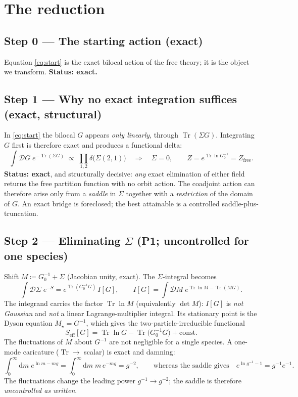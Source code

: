 \documentclass[11pt]{article}
\theoremstyle{remark}
\begin{document}
\section{The reduction}

\subsection*{Step 0 --- The starting action (exact)}

Equation \eqref{eq:start} is the exact bilocal action of the free theory; it is the
object we transform. \textbf{Status: exact.}

\subsection*{Step 1 --- Why no exact integration suffices (exact, structural)}

In \eqref{eq:start} the bilocal $G$ appears \emph{only linearly}, through
$\operatorname{Tr}(\Sigma G)$. Integrating $G$ first is therefore exact and produces a
functional delta:
\[
\int\mathcal{D}G\;e^{-\operatorname{Tr}(\Sigma G)}\;\propto\;\prod_{1,2}\delta\!\big(\Sigma(2,1)\big)
\quad\Longrightarrow\quad \Sigma=0,
\qquad Z=e^{\operatorname{Tr}\ln G_0^{-1}}=Z_{\mathrm{free}}.
\]
\textbf{Status: exact}, and structurally decisive: \emph{any} exact elimination of either
field returns the free partition function with no orbit action. The coadjoint action can
therefore arise only from a \emph{saddle} in $\Sigma$ together with a \emph{restriction}
of the domain of $G$. An exact bridge is foreclosed; the best attainable is a controlled
saddle-plus-truncation.

\subsection*{Step 2 --- Eliminating $\Sigma$ (P1; uncontrolled for one species)}

Shift $M\coloneqq G_0^{-1}+\Sigma$ (Jacobian unity, exact). The $\Sigma$-integral becomes
\[
\int\mathcal{D}\Sigma\;e^{-S}=e^{\operatorname{Tr}(G_0^{-1}G)}\,I[G],
\qquad
I[G]=\int\mathcal{D}M\;e^{\operatorname{Tr}\ln M-\operatorname{Tr}(MG)}.
\]
The integrand carries the factor $\operatorname{Tr}\ln M$ (equivalently $\det M$): $I[G]$ is
\emph{not Gaussian} and \emph{not} a linear Lagrange-multiplier integral. Its stationary
point is the Dyson equation $M_\star=G^{-1}$, which gives the two-particle-irreducible
functional
\begin{equation}
\label{eq:Seff}
S_{\mathrm{eff}}[G]=\operatorname{Tr}\ln G-\operatorname{Tr}\!\big(G_0^{-1}G\big)+\text{const}.
\end{equation}
The fluctuations of $M$ about $G^{-1}$ are not negligible for a single species. A
one-mode caricature ($\operatorname{Tr}\to$ scalar) is exact and damning:
\[
\int_0^\infty\! \mathrm{d}m\;e^{\ln m-mg}=\int_0^\infty\! \mathrm{d}m\;m\,e^{-mg}=g^{-2},
\qquad\text{whereas the saddle gives}\quad e^{\ln g^{-1}-1}=g^{-1}e^{-1}.
\]
The fluctuations change the leading power $g^{-1}\!\to\! g^{-2}$; the saddle is therefore
\emph{uncontrolled as written}.
\end{document}
